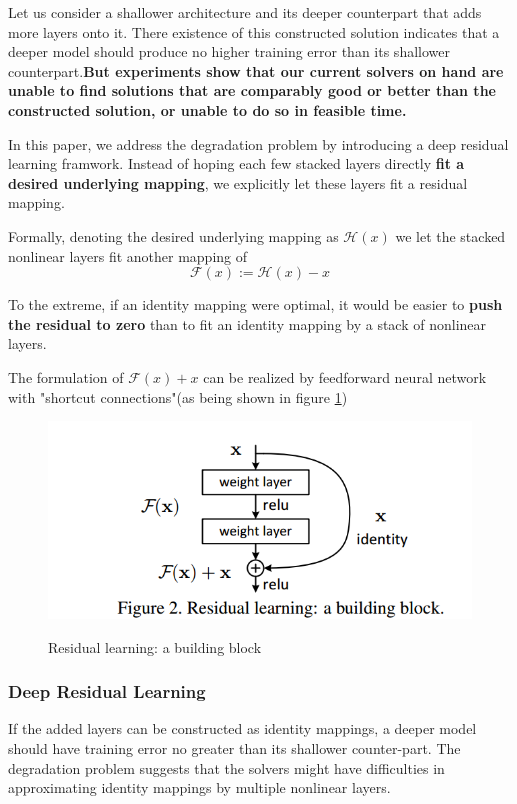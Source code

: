 \documentclass[11pt,en,bibstyle=ieeetr]{elegantpaper}
\begin{document}
Let us consider a shallower architecture and its deeper counterpart that adds more layers onto it.
There existence of this constructed solution indicates that a deeper model should produce no higher training error
than its shallower counterpart.\textbf{But experiments show that our current solvers on hand are unable to find solutions that are comparably good or better than the constructed solution, or unable to do so in feasible time.}

In this paper, we address the degradation problem by introducing a deep residual learning framwork.
Instead of hoping each few stacked layers directly \textbf{fit a desired underlying mapping}, we explicitly let these layers fit a residual mapping.

Formally, denoting the desired underlying mapping as $ \mathcal{H}(x) $
we let the stacked nonlinear layers fit another mapping of 
$$ 
\mathcal{F}(x):=\mathcal{H}(x)-x
$$

To the extreme, if an identity mapping were optimal, it would be easier to \textbf{push the residual
to zero} than to fit an identity mapping by a stack of nonlinear layers. 

The formulation of $ \mathcal{F}(x)+x $ can be realized by feedforward neural network with "shortcut connections"(as being shown in figure \ref{res})
\begin{figure}
	\centering
	\caption{Residual learning: a building block}
	\includegraphics{fig/res.png}
	\label{res}
\end{figure} 

\subsubsection{Deep Residual Learning}
If the added layers can be constructed as identity mappings, a deeper model should have training
error no greater than its shallower counter-part. The degradation problem suggests that the solvers might have difficulties in approximating identity mappings by multiple nonlinear layers.
\end{document}
